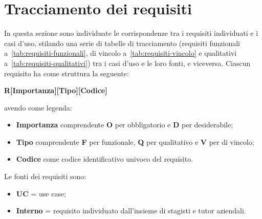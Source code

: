 \section{Tracciamento dei requisiti}\label{sec:tracciamento-requisiti}

In questa sezione sono individuate le corrispondenze tra i requisiti individuati e i casi d'uso, stilando una serie di tabelle di tracciamento 
(requisiti funzionali a~\ref{tab:requisiti-funzionali}, di vincolo a~\ref{tab:requisiti-vincolo} e qualitativi a~\ref{tab:requisiti-qualitativi}) tra i casi d'uso e le loro fonti, e viceversa.
Ciascun requisito ha come struttura la seguente:
\begin{center}
  \textbf{R[Importanza][Tipo][Codice]}
\end{center}
avendo come legenda:
\begin{itemize}
\item \textbf{Importanza} comprendente \textbf{O} per obbligatorio e \textbf{D} per desiderabile;
\item \textbf{Tipo} comprendente \textbf{F} per funzionale, \textbf{Q} per qualitativo e \textbf{V} per di vincolo;
\item \textbf{Codice} come codice identificativo univoco del requisito.
\end{itemize}
Le fonti dei requisiti sono:
\begin{itemize}
  \item \textbf{UC} = use case;
  \item \textbf{Interno} = requisito individuato dall'insieme di stagisti e tutor aziendali.
\end{itemize}


\renewcommand{\arraystretch}{1.1} %

